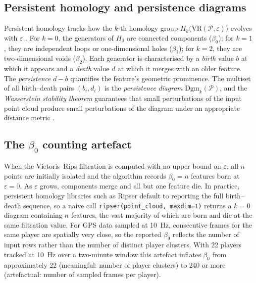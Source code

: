 \documentclass[11pt,a4paper]{article}
\begin{document}
\subsection{Persistent homology and persistence diagrams}

Persistent homology tracks how the \(k\)-th homology group
\(H_k\bigl(\mathrm{VR}(\mathcal{P},\varepsilon)\bigr)\)
evolves with \(\varepsilon\) \citep{Zomorodian2005,
Edelsbrunner2010}.  For \(k=0\), the generators of \(H_0\)
are connected components (\(\beta_0\)); for \(k=1\), they
are independent loops or one-dimensional holes (\(\beta_1\));
for \(k=2\), they are two-dimensional voids (\(\beta_2\)).
Each generator is characterised by a \emph{birth} value
\(b\) at which it appears and a \emph{death} value \(d\) at
which it merges with an older feature.  The
\emph{persistence} \(d - b\) quantifies the feature's
geometric prominence.  The multiset of all birth--death
pairs \((b_i, d_i)\) is the \emph{persistence diagram}
\(\mathrm{Dgm}_k(\mathcal{P})\), and the \emph{Wasserstein
stability theorem} guarantees that small perturbations of
the input point cloud produce small perturbations of the
diagram under an appropriate distance metric
\citep{CohenSteiner2007}.

\subsection{The \(\beta_0\) counting artefact}
\label{sec:artefact}

When the Vietoris--Rips filtration is computed with no upper
bound on \(\varepsilon\), all \(n\) points are initially
isolated and the algorithm records \(\beta_0 = n\) features
born at \(\varepsilon = 0\).  As \(\varepsilon\) grows,
components merge and all but one feature die.  In practice,
persistent homology libraries such as Ripser
\citep{Tralie2018} default to reporting the full birth--death
sequence, so a naive call
\texttt{ripser(point\_cloud, maxdim=1)} returns a
\(k=0\) diagram containing \(n\) features, the vast
majority of which are born and die at the same filtration
value.  For GPS data sampled at 10~Hz, consecutive frames
for the same player are spatially very close, so the
reported \(\beta_0\) reflects the number of input rows
rather than the number of distinct player clusters.  With 22
players tracked at 10~Hz over a two-minute window this
artefact inflates \(\beta_0\) from approximately 22
(meaningful: number of player clusters) to 240 or more
(artefactual: number of sampled frames per player).
\end{document}
